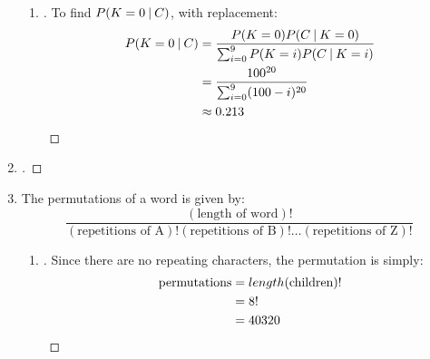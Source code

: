 \documentclass[paper=usletter, fontsize=12pt]{article}
\begin{document}
\begin{enumerate}
\begin{enumerate}
                \item
                \begin{proof}[\unskip\nopunct]
                    To find $P(K=0 \:\vert\: C)$, with replacement:
                    \begingroup
                    \addtolength{\jot}{1em}
                    \begin{align*}
                        P(K=0 \:\vert\: C) & = \frac{P(K=0)P(C \:\vert\: K=0)}{\sum_{i=0}^{9}P(K=i)P(C \:\vert\: K=i)} \\
                        & = \frac{100^{20}}{\sum_{i=0}^{9}(100-i)^{20}}\\
                        & \approx 0.213 \qedhere
                    \end{align*}
                    \endgroup
                \end{proof}
                \vspace{0.2in}

            \end{enumerate}

        \item
        \begin{proof}[\unskip\nopunct]
        \end{proof}
        \vspace{0.2in}

        \item
        The permutations of a word is given by:
        \begin{equation*}
            \frac{(\text{length of word})!}{(\text{repetitions of A})!(\text{repetitions of B})!\ldots (\text{repetitions of Z})!}
        \end{equation*}
        \begin{enumerate}

            \item
            \begin{proof}[\unskip\nopunct]
                Since there are no repeating characters, the permutation is
                simply:
                \begin{align*}
                    \text{permutations} & = length(\text{children})! \\
                    & = 8! \\
                    & = 40320 \qedhere
                \end{align*}
            \end{proof}
            \vspace{0.2in}


\end{enumerate}
\end{enumerate}
\end{document}
